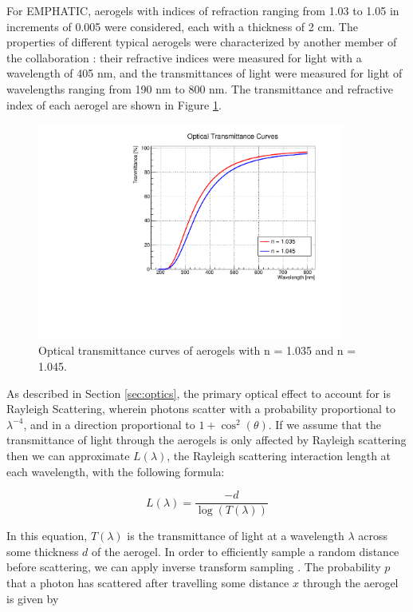 For EMPHATIC, aerogels with indices of refraction ranging from 1.03 to 1.05 in increments of 0.005 were considered, each with a thickness of 2 cm.
The properties of different typical aerogels were characterized by another member of the collaboration \cite{aerogelTabata}: their refractive indices were measured for light with a wavelength of 405 nm, and the transmittances of light were measured for light of wavelengths ranging from 190 nm to 800 nm.
The transmittance and refractive index of each aerogel are shown in Figure \ref{fig:transmittance}.

\begin{figure}[]
  \centering
  \includegraphics[width=0.9\textwidth]{./figs/transmittance.pdf}
    \caption{Optical transmittance curves of aerogels with n = 1.035 and n = 1.045.}
  \label{fig:transmittance}
\end{figure}

As described in Section \ref{sec:optics}, the primary optical effect to account for is Rayleigh Scattering, wherein photons scatter with a probability proportional to $\lambda^{-4}$, and in a direction proportional to $1 + \cos^2(\theta)$.
If we assume that the transmittance of light through the aerogels is only affected by Rayleigh scattering then we can approximate $L(\lambda)$, the Rayleigh scattering interaction length at each wavelength, with the following formula:

\begin{equation}
L(\lambda) = \frac{-d}{\log(T(\lambda))}
    \label{eq:scatLength}
\end{equation}

In this equation, $T(\lambda)$ is the transmittance of light at a wavelength $\lambda$ across some thickness $d$ of the aerogel.
In order to efficiently sample a random distance before scattering, we can apply inverse transform sampling .
The probability $p$ that a photon has scattered after travelling some distance $x$ through the aerogel is given by


